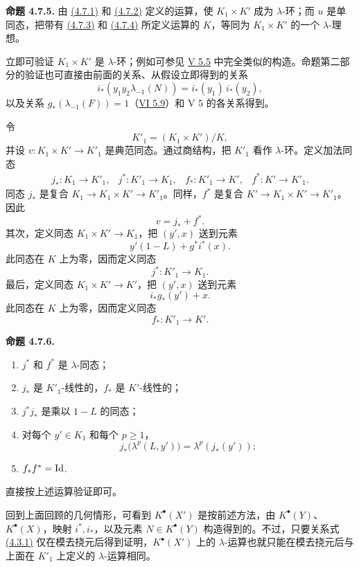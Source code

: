 \textbf{命题 4.7.5.} 由 \hyperlink{sga6.e07.eq.4-7-1}{(4.7.1)} 和 \hyperlink{sga6.e07.eq.4-7-2}{(4.7.2)} 定义的运算，使 \(K_1\times K'\) 成为 \(\lambda\)-环；而 \(u\) 是单同态，把带有 \hyperlink{sga6.e07.eq.4-7-3}{(4.7.3)} 和 \hyperlink{sga6.e07.eq.4-7-4}{(4.7.4)} 所定义运算的 \(K\)，等同为 \(K_1\times K'\) 的一个 \(\lambda\)-理想。

立即可验证 \(K_1\times K'\) 是 \(\lambda\)-环；例如可参见 \hyperlink{sga6.e05.para.5-5}{V 5.5} 中完全类似的构造。命题第二部分的验证也可直接由前面的关系、从假设立即得到的关系
\[
  i_*(y_1y_2\lambda_{-1}(N))=i_*(y_1)\,i_*(y_2),
\]
以及关系 \(g_*(\lambda_{-1}(F))=1\)（\hyperlink{sga6.e06.prop.5-9}{VI 5.9}）和 V 5 的各关系得到。

令
\[
  K'_1=(K_1\times K')/K,
\]
并设 \(v:K_1\times K'\to K'_1\) 是典范同态。通过商结构，把 \(K'_1\) 看作 \(\lambda\)-环。定义加法同态
\[
\begin{array}{llll}
j_*:K_1\to K'_1, & j^*:K'_1\to K_1, &
f_*:K'_1\to K', & f^*:K'\to K'_1 .
\end{array}
\]
同态 \(j_*\) 是复合 \(K_1\to K_1\times K'\to K'_1\)。同样，\(f^*\) 是复合 \(K'\to K_1\times K'\to K'_1\)。因此
\[
  v=j_*+f^*.
\]
其次，定义同态 \(K_1\times K'\to K_1\)，把 \((y',x)\) 送到元素
\[
  y'(1-L)+g^*i^*(x).
\]
此同态在 \(K\) 上为零，因而定义同态
\[
  j^*:K'_1\longrightarrow K_1.
\]
最后，定义同态 \(K_1\times K'\to K'\)，把 \((y',x)\) 送到元素
\[
  i_*g_*(y')+x.
\]
此同态在 \(K\) 上为零，因而定义同态
\[
  f_*:K'_1\longrightarrow K'.
\]

\textbf{命题 4.7.6.}
\begin{enumerate}[label=\roman*)]
\item \(j^*\) 和 \(f^*\) 是 \(\lambda\)-同态；
\item \(j_*\) 是 \(K'_1\)-线性的，\(f_*\) 是 \(K'\)-线性的；
\item \(j^*j_*\) 是乘以 \(1-L\) 的同态；
\item 对每个 \(y'\in K_1\) 和每个 \(p\ge1\)，
\[
  j_*\bigl(\lambda^p(L,y')\bigr)=\lambda^p(j_*(y'));
\]
\item \(f_*f^*=\operatorname{Id}\).
\end{enumerate}
直接按上述运算验证即可。

回到上面回顾的几何情形，可看到 \(K^\bullet(X')\) 是按前述方法，由 \(K^\bullet(Y)\)、\(K^\bullet(X)\)，映射 \(i^*,i_*\)，以及元素 \(N\in K^\bullet(Y)\) 构造得到的。不过，只要关系式 \hyperlink{sga6.e07.eq.4-3-1}{(4.3.1)} 仅在模去挠元后得到证明，\(K^\bullet(X')\) 上的 \(\lambda\)-运算也就只能在模去挠元后与上面在 \(K'_1\) 上定义的 \(\lambda\)-运算相同。

